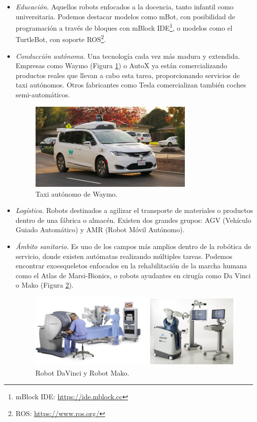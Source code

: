 \begin{itemize}
\item \textit{Educación.} Aquellos robots enfocados a la docencia, tanto infantil como universitaria. Podemos destacar modelos como mBot, con posibilidad de programación a través de bloques con mBlock IDE\footnote{mBlock IDE: \url{https://ide.mblock.cc}}, o modelos como el TurtleBot, con soporte ROS\footnote{ROS: \url{https://www.ros.org/}}.

\item \textit{Conducción autónoma.} Una tecnología cada vez más madura y extendida. Empresas como Waymo (Figura \ref{fig:waymo}) o AutoX ya están comercializando productos reales que llevan a cabo esta tarea, proporcionando servicios de taxi autónomos. Otros fabricantes como Tesla comercializan también coches semi-automáticos.\\

\begin{figure} [h!]
  \begin{center}
    \includegraphics[width=8cm]{figs/waymo.jpg}
  \end{center}
  \caption{Taxi autónomo de Waymo.}
  \label{fig:waymo}
\end{figure}

\item \textit{Logística.} Robots destinados a agilizar el transporte de materiales o productos dentro de una fábrica o almacén. Existen dos grandes grupos: AGV (Vehículo Guiado Automático) y AMR (Robot Móvil Autónomo).

\item \textit{Ámbito sanitario.} Es uno de los campos más amplios dentro de la robótica de servicio, donde existen autómatas realizando múltiples tareas. Podemos encontrar exoesqueletos enfocados en la rehabilitación de la marcha humana como el Atlas de Marsi-Bionics, o robots ayudantes en cirugía como Da Vinci o Mako (Figura \ref{fig:robots_cirugia}).

\begin{figure} [h!]
  \begin{center}
    \includegraphics[width=12cm]{figs/robots_cirugia.png}
  \end{center}
  \caption{Robot DaVinci y Robot Mako.}
  \label{fig:robots_cirugia}
\end{figure}


\end{itemize}
